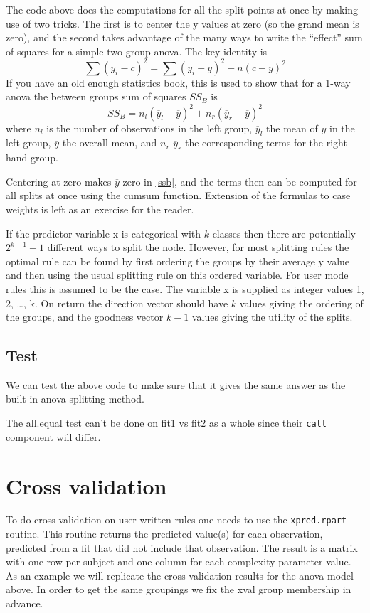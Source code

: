 The code above does the computations for all the split points at once
 by making use of two tricks. The first is to center the y values
at zero (so the grand mean is zero), and the second takes advantage of the
many ways to write the ``effect'' sum of squares for a simple two
group anova.
The key identity is
\begin{equation}
  \sum (y_i - c)^2 = \sum (y_i - \overline y)^2 +  n(c - \overline y)^2
\end{equation}
If you have an old enough statistics book, this is used to show that
for a 1-way anova the between groups sum of squares $SS_B$ is
\begin{equation}
  SS_B = n_l(\overline y_l - \overline y)^2 +
  n_r(\overline y_r - \overline y)^2 \label{ssb}
\end{equation}
where $n_l$ is the number of observations in the left group,
$\overline y_l$ the
mean of $y$ in the left group, $\overline y$ the overall mean,
and $n_r$ $\overline y_r$ the corresponding terms for the right hand group.

Centering at zero makes $\overline y$ zero in \eqref{ssb}, and the terms
then can be computed for all splits at once using the cumsum function.
Extension of the formulas to case weights is left as an exercise for
the reader.

If the predictor variable x is categorical with $k$ classes then there are
potentially $2^{k-1} -1$ different ways to split the node.
However, for most splitting rules the optimal rule can be found by first
ordering the groups by their average y value and then using the
usual splitting rule on this ordered variable.
For user mode rules this is assumed to be the case.
The variable x is supplied as integer values 1, 2, \ldots, k.
On return the direction vector should have $k$ values giving the ordering
of the groups, and the goodness vector $k-1$ values giving the utility of
the splits.


\subsection{Test}
We can test the above code to make sure that it gives the same answer as
the built-in anova splitting method.

\Rcodeplaceholder{}

The all.equal test can't be done on fit1 vs fit2 as a whole since their
\texttt{call} component will differ.

\section{Cross validation}
To do cross-validation on user written rules one needs to use the
\texttt{xpred.rpart} routine.
This routine returns the predicted value(s) for each observation,
predicted from a fit that did not include that observation.
The result is a matrix with one row per subject and one column for
each complexity parameter value.
As an example we will replicate the cross-validation results
for the anova model above.
In order to get the same groupings we fix the xval group membership
in advance.

